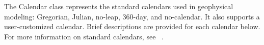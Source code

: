 
\label{sec:Calendar}
The Calendar class represents the standard calendars used in 
geophysical modeling:  Gregorian, Julian, no-leap, 360-day, and 
no-calendar.  It also supports a user-customized calendar.  Brief 
descriptions are provided for each calendar below.  For more information 
on standard calendars, see ~\cite{seidelman}.




